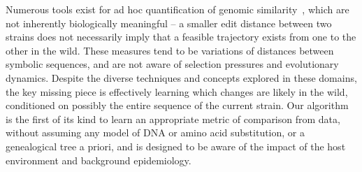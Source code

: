 \documentclass[onecolumn, compsoc,10pt]{IEEEtran}
\begin{document}
Numerous tools exist for ad hoc quantification of genomic similarity~\cite{posada1998modeltest,goldberger2005genomic,huelsenbeck1997phylogeny,neher2014predicting,VanderMeer2010,Smith2009}, which are not inherently biologically meaningful -- a smaller edit distance between two strains does not necessarily imply that a feasible trajectory exists from one to the other in the wild. These measures tend to be  variations of distances between symbolic sequences, and are not aware of selection pressures and evolutionary dynamics. Despite the diverse techniques and concepts explored in these domains, the key missing piece is effectively learning which changes are likely in the wild, conditioned on possibly the entire sequence of the current strain. Our algorithm is the first of its kind to learn an appropriate metric of comparison from data, without assuming any model of DNA or amino acid substitution, or a genealogical tree a priori, and is  designed to be aware of the impact of the  host environment and background epidemiology.
\end{document}

